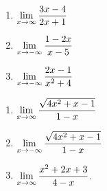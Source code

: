 \documentclass{ximera}
\begin{document}
 \begin{multicols}{3}
\begin{enumerate}
\setcounter{enumi}{\value{HW}}

\item\label{limitatinfinityfirst}   $\ds{ \lim_{x \rightarrow \infty} \dfrac{3x-4}{2x+1}}$

\item $\ds{ \lim_{x \rightarrow -\infty}  \dfrac{1-2x}{x-5}}$ 

\item $\ds{ \lim_{x \rightarrow -\infty}\dfrac{2x-1}{x^2+4}}$

\setcounter{HW}{\value{enumi}}
\end{enumerate}
\end{multicols}

 \begin{multicols}{3}
\begin{enumerate}
\setcounter{enumi}{\value{HW}}
\item $\ds{ \lim_{x \rightarrow \infty}\dfrac{\sqrt{4x^2+x-1}}{1-x}}$

\item $\ds{ \lim_{x \rightarrow -\infty}\dfrac{\sqrt{4x^2+x-1}}{1-x}}$

\item\label{limitatinfinitylast}  $\ds{ \lim_{x \rightarrow \infty} \dfrac{x^2+2x+3}{4-x}}$.

\setcounter{HW}{\value{enumi}}
\end{enumerate}
\end{multicols}
\end{document}
